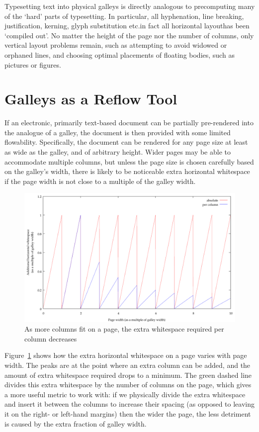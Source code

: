 Typesetting text into physical galleys is directly analogous to precomputing many of the `hard' parts of typesetting. In particular, all hyphenation, line breaking, justification, kerning, glyph substitution etc.\ed{}in fact all horizontal layout\ed{}has been `compiled out'. No matter the height of the page nor the number of columns, only vertical layout problems remain, such as attempting to avoid widowed or orphaned lines, and choosing optimal placements of floating bodies, such as pictures or figures.

\section{Galleys as a Reflow Tool}
If an electronic, primarily text-based document can be partially pre-rendered into the analogue of a galley, the document is then provided with some limited flowability. Specifically, the document can be rendered for any page size at least as wide as the galley, and of arbitrary height. Wider pages may be able to accommodate multiple columns, but unless the page size is chosen carefully based on the galley's width, there is likely to be noticeable extra horizontal whitespace if the page width is not close to a multiple of the galley width.

\begin{figure}
 \includegraphics[width=\textwidth]{gnuplot/1col}
 \caption[Extra whitespace in a single-galley document]{As more columns fit on a page, the extra whitespace required per column decreases}
 \label{fig:sawtooth}
\end{figure}


Figure~\ref{fig:sawtooth} shows how the extra horizontal whitespace on a page varies with page width. The peaks are at the point where an extra column can be added, and the amount of extra whitespace required drops to a minimum. The green dashed line divides this extra whitespace by the number of columns on the page, which gives a more useful metric to work with: if we physically divide the extra whitespace and insert it between the columns to increase their spacing (as opposed to leaving it on the right- or left-hand margins) then the wider the page, the less detriment is caused by the extra fraction of galley width.


